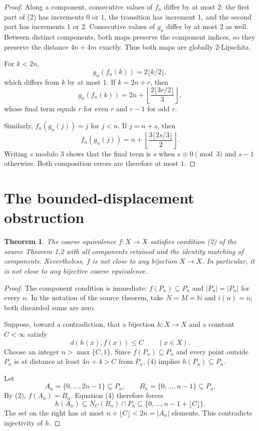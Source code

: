 \documentclass[11pt]{article}
\newtheorem{theorem}{Theorem}
\newcommand{\N}{\mathbb N}
\begin{document}
\begin{proof}
Along a component, consecutive values of $f_n$ differ by at most $2$:
the first part of (2) has increments $0$ or $1$, the transition has increment
$1$, and the second part has increments $1$ or $2$.  Consecutive values of
$g_n$ differ by at most $2$ as well.  Between distinct components, both maps
preserve the component indices, so they preserve the distance $4n+4m$
exactly.  Thus both maps are globally $2$-Lipschitz.

For $k<2n$,
\[
 g_n(f_n(k))=2\lfloor k/2\rfloor,
\]
which differs from $k$ by at most $1$.  If $k=2n+r$, then
\[
 g_n(f_n(k))
 =2n+\left\lfloor\frac{2\lfloor3r/2\rfloor}{3}\right\rfloor,
\]
whose final term equals $r$ for even $r$ and $r-1$ for odd $r$.

Similarly, $f_n(g_n(j))=j$ for $j<n$.  If $j=n+s$, then
\[
 f_n(g_n(j))
 =n+\left\lfloor\frac{3\lfloor2s/3\rfloor}{2}\right\rfloor.
\]
Writing $s$ modulo $3$ shows that the final term is $s$ when
$s\equiv0\pmod3$ and $s-1$ otherwise.  Both composition errors are therefore
at most $1$.
\end{proof}

\section{The bounded-displacement obstruction}

\begin{theorem}\label{thm:counterexample}
The coarse equivalence $f:X\to X$ satisfies condition \emph{(2)} of the
source Theorem 1.2 with all components retained and the identity matching of
components.  Nevertheless, $f$ is not close to any bijection $X\to X$.
In particular, it is not close to any bijective coarse equivalence.
\end{theorem}

\begin{proof}
The component condition is immediate: $f(P_n)\subseteq P_n$ and
$|P_n|=|P_n|$ for every $n$.  In the notation of the source theorem, take
$N=M=\N$ and $i(n)=n$; both discarded sums are zero.

Suppose, toward a contradiction, that a bijection $h:X\to X$ and a constant
$C<\infty$ satisfy
\[
 d(h(x),f(x))\leq C\qquad(x\in X).                         \tag{4}
\]
Choose an integer $n>\max\{C,1\}$.  Since $f(P_n)\subseteq P_n$ and every
point outside $P_n$ is at distance at least $4n+4>C$ from $P_n$, (4) implies
$h(P_n)\subseteq P_n$.

Let
\[
 A_n=\{0,\ldots,2n-1\}\subseteq P_n,
 \qquad B_n=\{0,\ldots,n-1\}\subseteq P_n.
\]
By (2), $f(A_n)=B_n$.  Equation (4) therefore forces
\[
 h(A_n)\subseteq N_C(B_n)\cap P_n
 \subseteq\{0,\ldots,n-1+\lfloor C\rfloor\}.
\]
The set on the right has at most $n+\lfloor C\rfloor<2n=|A_n|$ elements.
This contradicts injectivity of $h$.
\end{proof}
\end{document}

